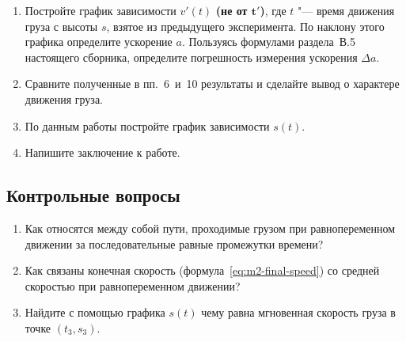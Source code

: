 \documentclass[a4paper, 12pt]{extarticle}
\begin{document}
\begin{enumerate}
\item Постройте график зависимости $v'(t)$ \textbf{(не от $\boldsymbol{t'}$)}, где $t$ "--- время движения груза с высоты $s$, взятое из предыдущего эксперимента. По наклону этого графика определите ускорение $a$. Пользуясь формулами раздела~В.5 настоящего сборника, определите погрешность измерения ускорения $\Delta a$.
\item Сравните полученные в пп.~6~и~10 результаты и сделайте вывод о характере движения груза. %
\item По данным работы постройте график зависимости $s(t)$.
\item Напишите заключение к работе.
\end{enumerate}

\subsection{Контрольные вопросы}
\begin{enumerate}
\item Как относятся между собой пути, проходимые грузом при равнопеременном движении за последовательные равные промежутки времени?
\item Как связаны конечная скорость (формула~\eqref{eq:m2-final-speed}) со средней скоростью при равнопеременном движении?
\item Найдите с помощью графика $s(t)$ чему равна мгновенная скорость груза в точке $(t_3, s_3)$. %
\end{enumerate}
\end{document}
